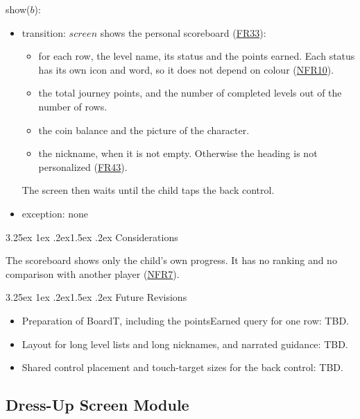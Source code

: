 \documentclass[10pt, titlepage]{article}
\makeatletter
\newcommand{\srsurl}{https://team-hindsight.github.io/ophthamology-game/SRS/SRS.pdf}
\newcommand{\srsitemref}[2]{\href{\srsurl\#nameddest=#1}{#2}}
\renewcommand\paragraph{\@startsection{paragraph}{4}{\z@}%
  {3.25ex \@plus 1ex \@minus .2ex}{1.5ex \@plus .2ex}%
  {\normalfont\normalsize\bfseries}}
\newcommand{\T}[1]{\mathit{#1}}          %
\makeatother
\begin{document}
\begin{samepage}
\noindent show($b$):
\begin{itemize}
\item transition: $\T{screen}$ shows the personal scoreboard
  (\srsitemref{FR_Scoreboard}{FR33}):
  \begin{itemize}
  \item for each row, the level name, its status and the points earned. Each
    status has its own icon and word, so it does not depend on colour
    (\srsitemref{NFR_Colour}{NFR10}).
  \item the total journey points, and the number of completed levels out of
    the number of rows.
  \item the coin balance and the picture of the character.
  \item the nickname, when it is not empty. Otherwise the heading is not
    personalized (\srsitemref{FR_Nickname}{FR43}).
  \end{itemize}
  The screen then waits until the child taps the back control.
\item exception: none
\end{itemize}
\end{samepage}
\par\pagebreak[0]

\paragraph{Considerations}

The scoreboard shows only the child's own progress. It has no ranking and no
comparison with another player (\srsitemref{NFR_NoPressure}{NFR7}).

\paragraph{Future Revisions}

\begin{itemize}
\item Preparation of BoardT, including the pointsEarned query for one row: TBD.
\item Layout for long level lists and long nicknames, and narrated guidance: TBD.
\item Shared control placement and touch-target sizes for the back control: TBD.
\end{itemize}

\newpage
\subsection{Dress-Up Screen Module} \label{mis:DressUp}
\end{document}

